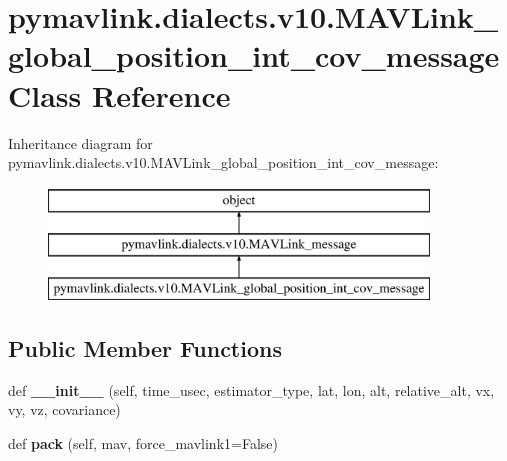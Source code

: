 \hypertarget{classpymavlink_1_1dialects_1_1v10_1_1MAVLink__global__position__int__cov__message}{}\section{pymavlink.\+dialects.\+v10.\+M\+A\+V\+Link\+\_\+global\+\_\+position\+\_\+int\+\_\+cov\+\_\+message Class Reference}
\label{classpymavlink_1_1dialects_1_1v10_1_1MAVLink__global__position__int__cov__message}
Inheritance diagram for pymavlink.\+dialects.\+v10.\+M\+A\+V\+Link\+\_\+global\+\_\+position\+\_\+int\+\_\+cov\+\_\+message\+:\begin{figure}[H]
\begin{center}
\leavevmode
\includegraphics[height=3.000000cm]{classpymavlink_1_1dialects_1_1v10_1_1MAVLink__global__position__int__cov__message}
\end{center}
\end{figure}
\subsection*{Public Member Functions}
\begin{DoxyCompactItemize}
\item 
\mbox{\label{classpymavlink_1_1dialects_1_1v10_1_1MAVLink__global__position__int__cov__message_addf5f703860df45fab1a2d3a063769fa}} 
def {\bfseries \+\_\+\+\_\+init\+\_\+\+\_\+} (self, time\+\_\+usec, estimator\+\_\+type, lat, lon, alt, relative\+\_\+alt, vx, vy, vz, covariance)
\item 
\mbox{\label{classpymavlink_1_1dialects_1_1v10_1_1MAVLink__global__position__int__cov__message_adbc6536014f6af4c4177ac5e6429a3c4}} 
def {\bfseries pack} (self, mav, force\+\_\+mavlink1=False)
\end{DoxyCompactItemize}
